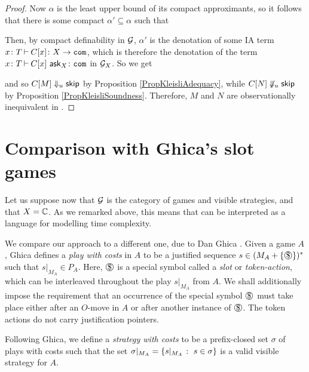 \documentclass[11pt]{report}
\begin{document}
\begin{proof}
  Now $\alpha$ is the least upper bound of its compact approximants, so it follows that there is some compact $\alpha'\subseteq \alpha$ such that
  Then, by compact definability in $\mathcal G$, $\alpha'$ is the denotation of some IA term $x\colon T \mathbin{\vdash} C[x]\colon X \to {\mathtt{com}}$, which is therefore the denotation of the term $x\colon T \mathbin{\vdash} C[x]\,\operatorname{{\mathsf{ask}}}_X \colon {\mathtt{com}}$ in $\mathcal G_X$.
  So we get
  and so $C[M]\Downarrow_u{\mathsf{skip}}$ by Proposition \ref{PropKleisliAdequacy}, while $C[N] \not\Downarrow_u {\mathsf{skip}}$ by Proposition \ref{PropKleisliSoundness}.
  Therefore, $M$ and $N$ are observationally inequivalent in \IAX.
\end{proof}

\section{Comparison with Ghica's slot games}

Let us suppose now that $\mathcal G$ is the category of games and visible strategies, and that $X=\mathbb{C}$.  
As we remarked above, this means that \IAX can be interpreted as a language for modelling time complexity.

We compare our approach to a different one, due to Dan Ghica \cite{SlotGames}.  
Given a game $A$, Ghica defines a \emph{play with costs} in $A$ to be a justified sequence $s\in (M_A + \{\slot\})^*$ such that $s\vert_{M_A}\in P_A$.
Here, $\slot$ is a special symbol called a \emph{slot} or \emph{token-action}, which can be interleaved throughout the play $s\vert_{M_A}$ from $A$.  
We shall additionally impose the requirement that an occurrence of the special symbol $\slot$ must take place either after an $O$-move in $A$ or after another instance of $\slot$.
The token actions do not carry justification pointers.

Following Ghica, we define a \emph{strategy with costs} to be a prefix-closed set $\sigma$ of plays with costs such that the set $\sigma\vert_{M_A} = \{s\vert_{M_A}\;\colon\; s\in \sigma\}$ is a valid visible strategy for $A$.
\end{document}
